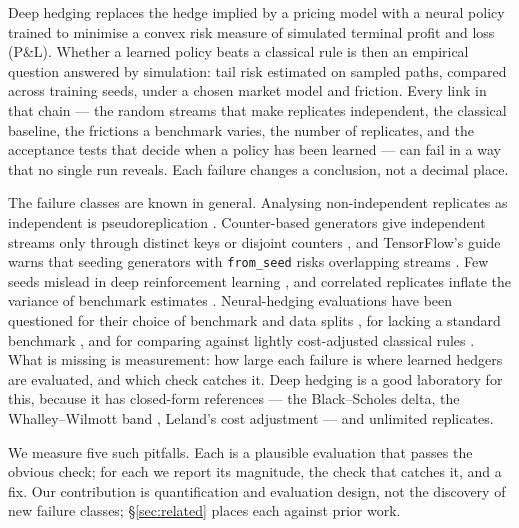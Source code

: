 \documentclass{article}
\newcommand{\fromseed}{\texttt{from\_seed}}
\begin{document}
Deep hedging \citep{buehler2019deep} replaces the hedge implied by a pricing model with a neural
policy trained to minimise a convex risk measure of simulated terminal profit and loss (P\&L).
Whether a learned policy beats a classical rule is then an empirical question answered by
simulation: tail risk estimated on sampled paths, compared across training seeds, under a chosen
market model and friction. Every link in that chain --- the random streams that make replicates
independent, the classical baseline, the frictions a benchmark varies, the number of replicates,
and the acceptance tests that decide when a policy has been learned --- can fail in a way that no
single run reveals. Each failure changes a conclusion, not a decimal place.

The failure classes are known in general. Analysing non-independent replicates as independent is
pseudoreplication \citep{hurlbert1984pseudoreplication}. Counter-based generators give
independent streams only through distinct keys or disjoint counters \citep{salmon2011parallel},
and TensorFlow's guide warns that seeding generators with \fromseed{} risks overlapping streams
\citep{tensorflow2024guide}. Few seeds mislead in deep reinforcement learning
\citep{henderson2018deep,colas2018seeds,agarwal2021deep}, and correlated replicates inflate the
variance of benchmark estimates \citep{bouthillier2021accounting}. Neural-hedging evaluations
have been questioned for their choice of benchmark and data splits \citep{ruf2020neural}, for
lacking a standard benchmark \citep{pickard2023deep}, and for comparing against lightly
cost-adjusted classical rules \citep{kumar2026deep}. What is missing is measurement: how large
each failure is where learned hedgers are evaluated, and which check catches it. Deep hedging is
a good laboratory for this, because it has closed-form references --- the Black--Scholes delta,
the Whalley--Wilmott band \citep{whalley1997asymptotic}, Leland's cost adjustment
\citep{leland1985option} --- and unlimited replicates.

We measure five such pitfalls. Each is a plausible evaluation that passes the obvious check; for
each we report its magnitude, the check that catches it, and a fix. Our contribution is
quantification and evaluation design, not the discovery of new failure classes;
\S\ref{sec:related} places each against prior work.
\end{document}
